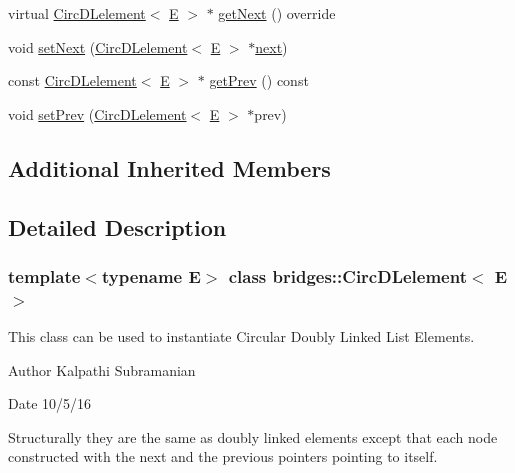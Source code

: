 \begin{DoxyCompactItemize}
\item 
virtual \mbox{\hyperlink{classbridges_1_1_circ_d_lelement}{Circ\+D\+Lelement}}$<$ \mbox{\hyperlink{namespacebridges_acfb0a4f7877d8f63de3e6862004c50eda3a3ea00cfc35332cedf6e5e9a32e94da}{E}} $>$ $\ast$ \mbox{\hyperlink{classbridges_1_1_circ_d_lelement_a52996d42efc5680d1f8b406143abfee5}{get\+Next}} () override
\item 
void \mbox{\hyperlink{classbridges_1_1_circ_d_lelement_a0bdf28de82173f2099673d18f6f62810}{set\+Next}} (\mbox{\hyperlink{classbridges_1_1_circ_d_lelement}{Circ\+D\+Lelement}}$<$ \mbox{\hyperlink{namespacebridges_acfb0a4f7877d8f63de3e6862004c50eda3a3ea00cfc35332cedf6e5e9a32e94da}{E}} $>$ $\ast$\mbox{\hyperlink{classbridges_1_1_s_lelement_ad7449d10a09ebc52653a7baed812aa43}{next}})
\item 
const \mbox{\hyperlink{classbridges_1_1_circ_d_lelement}{Circ\+D\+Lelement}}$<$ \mbox{\hyperlink{namespacebridges_acfb0a4f7877d8f63de3e6862004c50eda3a3ea00cfc35332cedf6e5e9a32e94da}{E}} $>$ $\ast$ \mbox{\hyperlink{classbridges_1_1_circ_d_lelement_a8a1aa2f979094bccf2cca2ca31f0373d}{get\+Prev}} () const
\item 
void \mbox{\hyperlink{classbridges_1_1_circ_d_lelement_a5b2a0dad47208829bb2c17d8bc0ee74d}{set\+Prev}} (\mbox{\hyperlink{classbridges_1_1_circ_d_lelement}{Circ\+D\+Lelement}}$<$ \mbox{\hyperlink{namespacebridges_acfb0a4f7877d8f63de3e6862004c50eda3a3ea00cfc35332cedf6e5e9a32e94da}{E}} $>$ $\ast$prev)
\end{DoxyCompactItemize}
\subsection*{Additional Inherited Members}


\subsection{Detailed Description}
\subsubsection*{template$<$typename E$>$\newline
class bridges\+::\+Circ\+D\+Lelement$<$ E $>$}

This class can be used to instantiate Circular Doubly Linked List Elements. 

\begin{DoxyAuthor}{Author}
Kalpathi Subramanian 
\end{DoxyAuthor}
\begin{DoxyDate}{Date}
10/5/16
\end{DoxyDate}
Structurally they are the same as doubly linked elements except that each node constructed with the next and the previous pointers pointing to itself.

